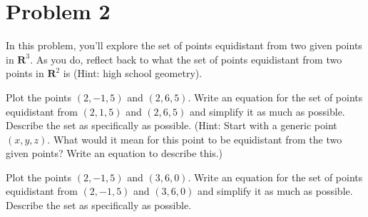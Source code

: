 \documentclass[11pt]{article}
\renewcommand{\R}{\mathbf{R}}
\begin{document}
\section*{Problem 2}
In this problem, you'll explore the set of points equidistant from two given points in $\R^3$. As you do, reflect back to what the set of points equidistant from two points in $\R^2$ is (Hint: high school geometry).
\begin{enum}{\alph}
\item Plot the points $(2,-1,5)$ and $(2,6,5)$. Write an equation for the set of points equidistant from $(2,1,5)$ and $(2,6,5)$ and simplify it as much as possible. Describe the set as specifically as possible. (Hint: Start with a generic point $(x,y,z)$. What would it mean for this point to be equidistant from the two given points? Write an equation to describe this.)

\item Plot the points $(2,-1,5)$ and $(3,6,0)$. Write an equation for the set of points equidistant
from $(2,-1,5)$ and $(3,6,0)$ and simplify it as much as possible. Describe the set as specifically as possible.
\end{enum}
\end{document}
